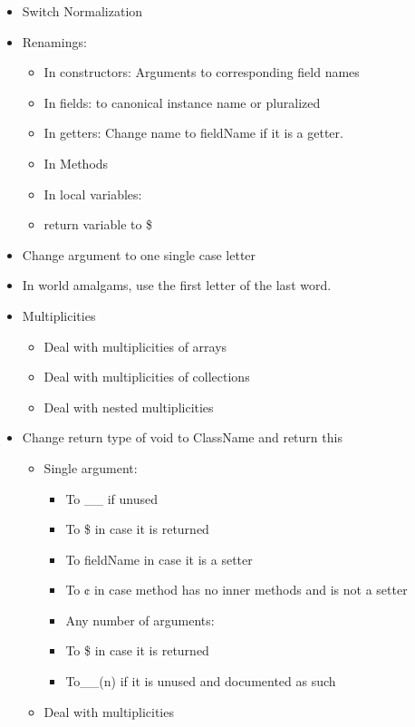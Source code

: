 \begin{itemize}
\item Switch Normalization
\item Renamings:
\begin{itemize}
  \item In constructors: Arguments to corresponding field names
  \item In fields: to canonical instance name or pluralized
  \item In getters: Change name to fieldName if it is a getter.
  \item In Methods
  \item In local variables:
  \item return variable to \$
\end{itemize}
\item Change argument to one single case letter
\item In world amalgams, use the first letter of the last word.
\item Multiplicities
\begin{itemize}
  \item Deal with multiplicities of arrays
  \item Deal with multiplicities of collections
  \item Deal with nested multiplicities
\end{itemize}
\item Change return type of void to ClassName and return this
\begin{itemize}
  \item Single argument:
  \begin{itemize}
    \item To \_\_ if unused
    \item To \$ in case it is returned
    \item To fieldName in case it is a setter
    \item To ¢ in case method has no inner methods and is not a setter
   \end{itemize}
  \begin{itemize}
    \item Any number of arguments:
    \item To \$ in case it is returned
    \item To__(n) if it is unused and documented as such
   \end{itemize}
  \item Deal with multiplicities
\end{itemize}
\end{itemize}

